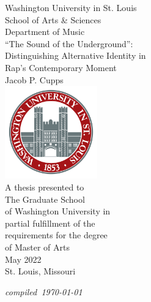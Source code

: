 \begin{titlepage}
    \begin{center}
        \small Washington University in St. Louis \\
                   School of Arts \& Sciences \\
                       Department of Music \\
        \vspace*{1.25in}
        \Large   ``The Sound of the Underground'': \\
        \vspace{0.1cm}
        \large   Distinguishing Alternative Identity in \\ 
                      Rap's Contemporary Moment  \\
        \vspace{0.5cm}
        \normalsize      Jacob P. Cupps \\
        \vfill
        \includegraphics[width=0.3\textwidth]{images/misc/header_logo.png} \\
        \vspace{0.8cm}
        \small A thesis presented to \\ 
                The Graduate School \\ 
             of Washington University in \\ 
             partial fulfillment of the \\ 
             requirements for the degree \\ 
                 of Master of Arts \\
        \vspace{0.8cm}
        \normalsize May 2022 \\
        St. Louis, Missouri
    \end{center}
    \vspace*{0.3cm}
    \hfill{\small \textit{compiled~\today}}
\end{titlepage}